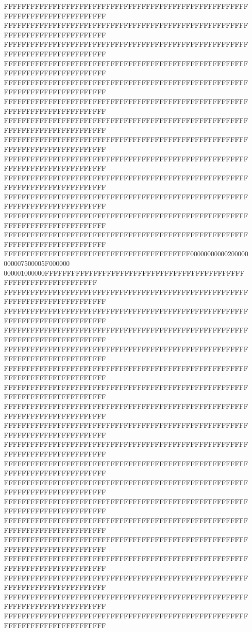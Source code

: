 FFFFFFFFFFFFFFFFFFFFFFFFFFFFFFFFFFFFFFFFFFFFFFFFFFFFFFFFFFFFFFFFFFFFFFFFFFFFFF
FFFFFFFFFFFFFFFFFFFFFFFFFFFFFFFFFFFFFFFFFFFFFFFFFFFFFFFFFFFFFFFFFFFFFFFFFFFFFF
FFFFFFFFFFFFFFFFFFFFFFFFFFFFFFFFFFFFFFFFFFFFFFFFFFFFFFFFFFFFFFFFFFFFFFFFFFFFFF
FFFFFFFFFFFFFFFFFFFFFFFFFFFFFFFFFFFFFFFFFFFFFFFFFFFFFFFFFFFFFFFFFFFFFFFFFFFFFF
FFFFFFFFFFFFFFFFFFFFFFFFFFFFFFFFFFFFFFFFFFFFFFFFFFFFFFFFFFFFFFFFFFFFFFFFFFFFFF
FFFFFFFFFFFFFFFFFFFFFFFFFFFFFFFFFFFFFFFFFFFFFFFFFFFFFFFFFFFFFFFFFFFFFFFFFFFFFF
FFFFFFFFFFFFFFFFFFFFFFFFFFFFFFFFFFFFFFFFFFFFFFFFFFFFFFFFFFFFFFFFFFFFFFFFFFFFFF
FFFFFFFFFFFFFFFFFFFFFFFFFFFFFFFFFFFFFFFFFFFFFFFFFFFFFFFFFFFFFFFFFFFFFFFFFFFFFF
FFFFFFFFFFFFFFFFFFFFFFFFFFFFFFFFFFFFFFFFFFFFFFFFFFFFFFFFFFFFFFFFFFFFFFFFFFFFFF
FFFFFFFFFFFFFFFFFFFFFFFFFFFFFFFFFFFFFFFFFFFFFFFFFFFFFFFFFFFFFFFFFFFFFFFFFFFFFF
FFFFFFFFFFFFFFFFFFFFFFFFFFFFFFFFFFFFFFFFFFFFFFFFFFFFFFFFFFFFFFFFFFFFFFFFFFFFFF
FFFFFFFFFFFFFFFFFFFFFFFFFFFFFFFFFFFFFFFFFFFFFFFFFFFFFFFFFFFFFFFFFFFFFFFFFFFFFF
FFFFFFFFFFFFFFFFFFFFFFFFFFFFFFFFFFFFFFFFFFFFFFFFFFFFFFFFFFFFFFFFFFFFFFFFFFFFFF
FFFFFFFFFFFFFFFFFFFFFFFFFFFFFFFFFFFFFFFFFF00000000000200000000007500005F000000
000001000000FFFFFFFFFFFFFFFFFFFFFFFFFFFFFFFFFFFFFFFFFFFFFFFFFFFFFFFFFFFFFFFFFF
FFFFFFFFFFFFFFFFFFFFFFFFFFFFFFFFFFFFFFFFFFFFFFFFFFFFFFFFFFFFFFFFFFFFFFFFFFFFFF
FFFFFFFFFFFFFFFFFFFFFFFFFFFFFFFFFFFFFFFFFFFFFFFFFFFFFFFFFFFFFFFFFFFFFFFFFFFFFF
FFFFFFFFFFFFFFFFFFFFFFFFFFFFFFFFFFFFFFFFFFFFFFFFFFFFFFFFFFFFFFFFFFFFFFFFFFFFFF
FFFFFFFFFFFFFFFFFFFFFFFFFFFFFFFFFFFFFFFFFFFFFFFFFFFFFFFFFFFFFFFFFFFFFFFFFFFFFF
FFFFFFFFFFFFFFFFFFFFFFFFFFFFFFFFFFFFFFFFFFFFFFFFFFFFFFFFFFFFFFFFFFFFFFFFFFFFFF
FFFFFFFFFFFFFFFFFFFFFFFFFFFFFFFFFFFFFFFFFFFFFFFFFFFFFFFFFFFFFFFFFFFFFFFFFFFFFF
FFFFFFFFFFFFFFFFFFFFFFFFFFFFFFFFFFFFFFFFFFFFFFFFFFFFFFFFFFFFFFFFFFFFFFFFFFFFFF
FFFFFFFFFFFFFFFFFFFFFFFFFFFFFFFFFFFFFFFFFFFFFFFFFFFFFFFFFFFFFFFFFFFFFFFFFFFFFF
FFFFFFFFFFFFFFFFFFFFFFFFFFFFFFFFFFFFFFFFFFFFFFFFFFFFFFFFFFFFFFFFFFFFFFFFFFFFFF
FFFFFFFFFFFFFFFFFFFFFFFFFFFFFFFFFFFFFFFFFFFFFFFFFFFFFFFFFFFFFFFFFFFFFFFFFFFFFF
FFFFFFFFFFFFFFFFFFFFFFFFFFFFFFFFFFFFFFFFFFFFFFFFFFFFFFFFFFFFFFFFFFFFFFFFFFFFFF
FFFFFFFFFFFFFFFFFFFFFFFFFFFFFFFFFFFFFFFFFFFFFFFFFFFFFFFFFFFFFFFFFFFFFFFFFFFFFF
FFFFFFFFFFFFFFFFFFFFFFFFFFFFFFFFFFFFFFFFFFFFFFFFFFFFFFFFFFFFFFFFFFFFFFFFFFFFFF
FFFFFFFFFFFFFFFFFFFFFFFFFFFFFFFFFFFFFFFFFFFFFFFFFFFFFFFFFFFFFFFFFFFFFFFFFFFFFF
FFFFFFFFFFFFFFFFFFFFFFFFFFFFFFFFFFFFFFFFFFFFFFFFFFFFFFFFFFFFFFFFFFFFFFFFFFFFFF
FFFFFFFFFFFFFFFFFFFFFFFFFFFFFFFFFFFFFFFFFFFFFFFFFFFFFFFFFFFFFFFFFFFFFFFFFFFFFF
FFFFFFFFFFFFFFFFFFFFFFFFFFFFFFFFFFFFFFFFFFFFFFFFFFFFFFFFFFFFFFFFFFFFFFFFFFFFFF
FFFFFFFFFFFFFFFFFFFFFFFFFFFFFFFFFFFFFFFFFFFFFFFFFFFFFFFFFFFFFFFFFFFFFFFFFFFFFF
